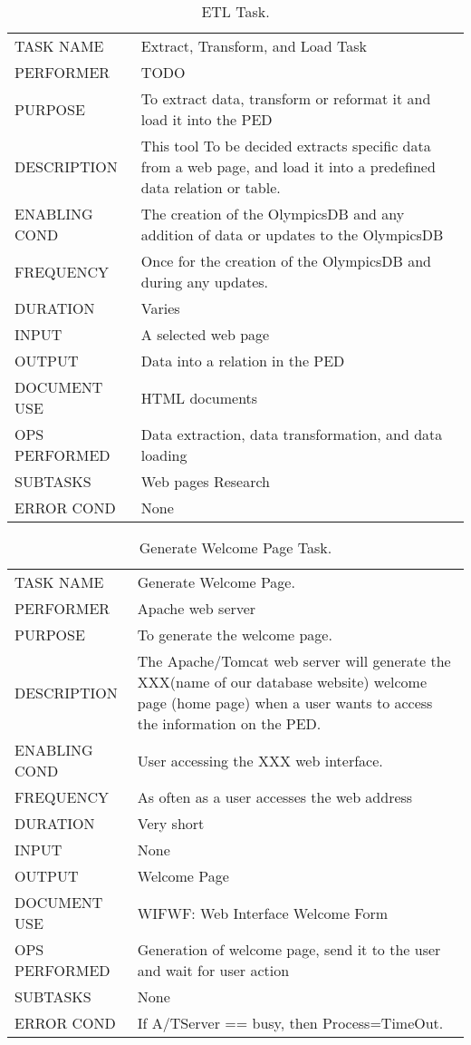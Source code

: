 \documentclass{article}
\begin{document}
\begin{table}[h!]
  \centering
  \caption{ETL Task.}
  \label{tab:table5}
  \begin{tabular}{lp{10cm}}
       \hline
     TASK NAME & Extract, Transform, and Load Task \\
     PERFORMER & {\color{red}TODO}\\
     PURPOSE & To extract data, transform or reformat it and load it into the PED \\
     DESCRIPTION & This tool {\color{red}To be decided} extracts specific data from a web page, and load it into a predefined data relation or table.\\
     ENABLING COND & The creation of the OlympicsDB and any addition of data or updates to the OlympicsDB\\
     FREQUENCY & Once for the creation of the OlympicsDB and during any updates. \\
     DURATION & Varies \\
     INPUT & A selected web page\\
     OUTPUT & Data into a relation in the PED\\
     DOCUMENT USE & HTML documents\\
     OPS PERFORMED & Data extraction, data transformation, and data loading\\
     SUBTASKS & Web pages Research \\
     ERROR COND &  None\\
       \hline
  \end{tabular}
\end{table}

\begin{table}[h!]
  \centering
  \caption{Generate Welcome Page Task.}
  \label{tab:table5}
  \begin{tabular}{lp{10cm}}
       \hline
     TASK NAME & Generate Welcome Page.\\
     PERFORMER & Apache web server\\
     PURPOSE & To generate the welcome page.\\
     DESCRIPTION & The Apache/Tomcat web server will generate the XXX(name of our database website) welcome page (home page) when a user wants to access the information on the PED. \\
     ENABLING COND & User accessing the XXX web interface. \\
     FREQUENCY & As often as a user accesses the web address \\
     DURATION & Very short\\
     INPUT & None\\
     OUTPUT & Welcome Page\\
     DOCUMENT USE & WIFWF: Web Interface Welcome Form\\
     OPS PERFORMED & Generation of welcome page, send it to the user and wait for user action\\
     SUBTASKS & None\\
     ERROR COND &  If A/TServer == busy, then Process=TimeOut. \\
       \hline
  \end{tabular}
\end{table}
\end{document}
